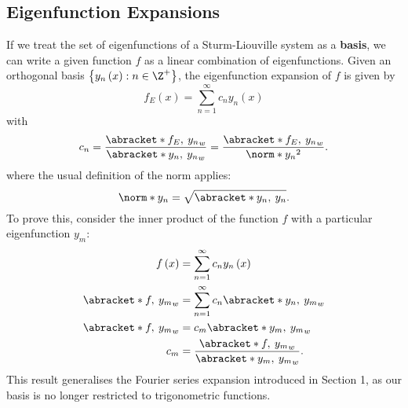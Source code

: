 \documentclass{article}
\begin{document}
\subsection{Eigenfunction Expansions}
If we treat the set of eigenfunctions of a Sturm-Liouville system as
a \textbf{basis}, we can write a given function \(f\) as a linear combination
of eigenfunctions. Given an orthogonal basis \(\left\{ y_n\left( x \right) : n \in \Z^{+} \right\}\),
the eigenfunction expansion of \(f\) is given by
\begin{equation*}
    f_E\left( x \right) = \sum_{n = 1}^\infty c_n y_n\left( x \right)
\end{equation*}
with
\begin{equation*}
    c_n = \frac{\abracket*{f_E,\: y_n}_w}{\abracket*{y_n,\: y_n}_w} = \frac{\abracket*{f_E,\: y_n}_w}{\norm*{y_n}^2}.
\end{equation*}
where the usual definition of the norm applies:
\begin{equation*}
    \norm*{y_n} = \sqrt{\abracket*{y_n,\: y_n}}.
\end{equation*}
To prove this, consider the inner product of the function \(f\) with
a particular eigenfunction \(y_m\):
\begin{align*}
    f\left( x \right)      & = \sum_{n = 1}^\infty c_n y_n\left( x \right)                \\
    \abracket*{f,\: y_m}_w & = \sum_{n = 1}^\infty c_n \abracket*{y_n,\: y_m}_w           \\
    \abracket*{f,\: y_m}_w & = c_m \abracket*{y_m,\: y_m}_w                               \\
    c_m                      & = \frac{\abracket*{f,\: y_m}_w}{\abracket*{y_m,\: y_m}_w}.
\end{align*}
This result generalises the Fourier series expansion introduced in Section 1, as our basis
is no longer restricted to trigonometric functions.
\end{document}
